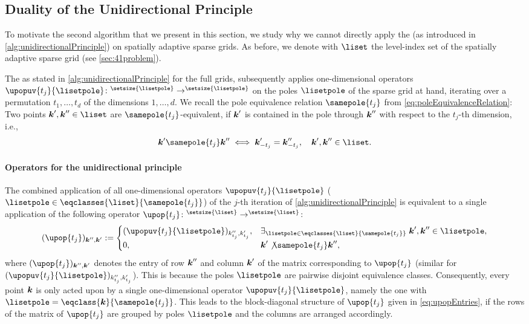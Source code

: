 \subsection{Duality of the Unidirectional Principle}
\label{sec:452duality}

To motivate the second algorithm that we present in this section,
we study why we cannot directly apply the \up
(as introduced in \cref{alg:unidirectionalPrinciple})
on spatially adaptive sparse grids.
As before, we denote with $\liset$ the level-index set of
the spatially adaptive sparse grid (see \cref{sec:41problem}).

The \up\punctfix{,} as stated in
\cref{alg:unidirectionalPrinciple} for the full grids,
subsequently applies one-dimensional operators
$\upopuv{t_j}{\lisetpole}\colon \real^{\setsize{\lisetpole}} \to
\real^{\setsize{\lisetpole}}$
on the poles $\lisetpole$ of the sparse grid at hand,
iterating over a permutation $t_1, \dotsc, t_d$
of the dimensions $1, \dotsc, d$.
We recall the pole equivalence relation $\samepole{t_j}$
from \cref{eq:poleEquivalenceRelation}:
Two points $\*k', \*k'' \in \liset$ are $\samepole{t_j}$-equivalent,
if ${\boldsymbol{k}}'$ is contained in the pole through ${\boldsymbol{k}}''$
with respect to the $t_j$-th dimension, i.e.,
\begin{equation}
  \*k' \samepole{t_j} \*k'' \iff \*k'_{-t_j} = \*k''_{-t_j},\quad
  \*k', \*k'' \in \liset.
\end{equation}

\paragraph{Operators for the unidirectional principle}

The combined application of all one-dimensional operators
$\upopuv{t_j}{\lisetpole}$
($\lisetpole \in \eqclasses{\liset}{\samepole{t_j}}$)
of the $j$-th iteration of \cref{alg:unidirectionalPrinciple}
is equivalent to a single application of the following operator
$\upop{t_j}\colon \real^{\setsize{\liset}} \to \real^{\setsize{\liset}}$:
\begin{equation}
  \label{eq:upopEntries}
  (\upop{t_j})_{\*k'',\*k'}
  :=
  \begin{cases}
    (\upopuv{t_j}{\lisetpole})_{k''_{t_j},k'_{t_j}},&
    \ex{\lisetpole \in \eqclasses{\liset}{\samepole{t_j}}}{
      \*k', \*k'' \in \lisetpole
    },\\
    0,&\*k' \not\samepole{t_j} \*k'',
  \end{cases}
\end{equation}
where $(\upop{t_j})_{\*k'',\*k'}$ denotes the entry of row ${\boldsymbol{k}}''$
and column ${\boldsymbol{k}}'$ of the matrix corresponding to $\upop{t_j}$
(similar for $(\upopuv{t_j}{\lisetpole})_{k''_{t_j},k'_{t_j}}$).
This is because the poles $\lisetpole$ are pairwise disjoint
equivalence classes.
Consequently, every point ${\boldsymbol{k}}$ is only acted upon by a single
one-dimensional operator $\upopuv{t_j}{\lisetpole}$,
namely the one with $\lisetpole = \eqclass{\*k}{\samepole{t_j}}$.
This leads to the block-diagonal structure
of $\upop{t_j}$ given in \eqref{eq:upopEntries},
if the rows of the matrix of $\upop{t_j}$
are grouped by poles $\lisetpole$ and the columns are arranged accordingly.

